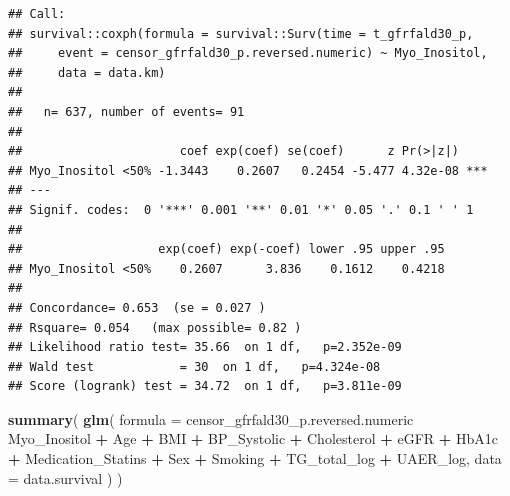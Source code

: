 \documentclass[]{article}
\newenvironment{Shaded}{\begin{snugshade}}{\end{snugshade}}
\newcommand{\DataTypeTok}[1]{\textcolor[rgb]{0.13,0.29,0.53}{#1}}
\newcommand{\KeywordTok}[1]{\textcolor[rgb]{0.13,0.29,0.53}{\textbf{#1}}}
\newcommand{\NormalTok}[1]{#1}
\newcommand{\OperatorTok}[1]{\textcolor[rgb]{0.81,0.36,0.00}{\textbf{#1}}}
\newcommand{\StringTok}[1]{\textcolor[rgb]{0.31,0.60,0.02}{#1}}
\begin{document}
\begin{verbatim}
## Call:
## survival::coxph(formula = survival::Surv(time = t_gfrfald30_p, 
##     event = censor_gfrfald30_p.reversed.numeric) ~ Myo_Inositol, 
##     data = data.km)
## 
##   n= 637, number of events= 91 
## 
##                      coef exp(coef) se(coef)      z Pr(>|z|)    
## Myo_Inositol <50% -1.3443    0.2607   0.2454 -5.477 4.32e-08 ***
## ---
## Signif. codes:  0 '***' 0.001 '**' 0.01 '*' 0.05 '.' 0.1 ' ' 1
## 
##                   exp(coef) exp(-coef) lower .95 upper .95
## Myo_Inositol <50%    0.2607      3.836    0.1612    0.4218
## 
## Concordance= 0.653  (se = 0.027 )
## Rsquare= 0.054   (max possible= 0.82 )
## Likelihood ratio test= 35.66  on 1 df,   p=2.352e-09
## Wald test            = 30  on 1 df,   p=4.324e-08
## Score (logrank) test = 34.72  on 1 df,   p=3.811e-09
\end{verbatim}

\begin{Shaded}
\begin{Highlighting}[]
\KeywordTok{summary}\NormalTok{( }
  \KeywordTok{glm}\NormalTok{(}
    \DataTypeTok{formula =}
\NormalTok{      censor_gfrfald30_p.reversed.numeric }\OperatorTok{~}\StringTok{ }
\StringTok{      }\NormalTok{Myo_Inositol }\OperatorTok{+}\StringTok{ }
\StringTok{      }\NormalTok{Age }\OperatorTok{+}
\StringTok{      }\NormalTok{BMI }\OperatorTok{+}\StringTok{ }
\StringTok{      }\NormalTok{BP_Systolic }\OperatorTok{+}\StringTok{ }
\StringTok{      }\NormalTok{Cholesterol }\OperatorTok{+}\StringTok{ }
\StringTok{      }\NormalTok{eGFR }\OperatorTok{+}\StringTok{ }
\StringTok{      }\NormalTok{HbA1c }\OperatorTok{+}
\StringTok{      }\NormalTok{Medication_Statins }\OperatorTok{+}
\StringTok{      }\NormalTok{Sex }\OperatorTok{+}\StringTok{  }
\StringTok{      }\NormalTok{Smoking }\OperatorTok{+}\StringTok{ }
\StringTok{      }\NormalTok{TG_total_log }\OperatorTok{+}
\StringTok{      }\NormalTok{UAER_log, }
    \DataTypeTok{data =}\NormalTok{ data.survival}
\NormalTok{  )}
\NormalTok{)}
\end{Highlighting}
\end{Shaded}
\end{document}
